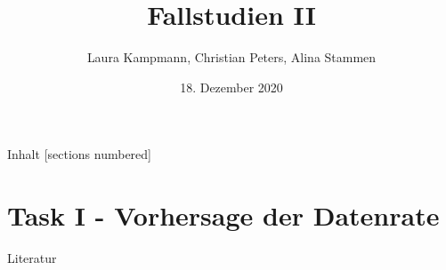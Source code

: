 \documentclass[10pt]{beamer}
\title{Fallstudien II}
\date{18. Dezember 2020}
\author{Laura Kampmann, Christian Peters, Alina Stammen}
\begin{document}
\maketitle

\begin{frame}{Inhalt}
  [sections numbered]
  \tableofcontents
\end{frame}

%

%

\section{Task I - Vorhersage der Datenrate}














\appendix

\begin{frame}[allowframebreaks]{Literatur}

  \nocite{XGBoost}

  
  

\end{frame}
\end{document}
